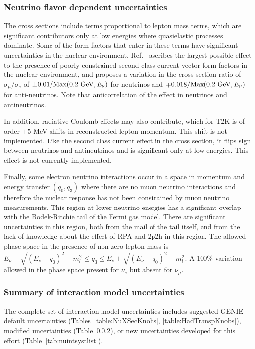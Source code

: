 \subsubsection{Neutrino flavor dependent uncertainties}
The cross sections include terms proportional to lepton mass terms, which are significant contributors only at low energies where quasielastic processes dominate.  Some of the form factors that enter in these terms have significant uncertainties in the nuclear environment.  Ref.~\cite{Day-McFarland:2012} ascribes the largest possible effect to the presence of poorly constrained second-class current vector form factors in the nuclear environment, and proposes a variation in the cross section ratio of $\sigma_\mu/\sigma_e$ of $\pm 0.01/{\rm\textstyle Max}(0.2~{\rm\textstyle GeV},E_\nu)$ for neutrinos and $\mp 0.018/{\rm\textstyle Max}(0.2~ {\rm\textstyle GeV},E_\nu)$ for anti-neutrinos.  Note that anticorrelation of the effect in neutrinos and antineutrinos.    

In addition, radiative Coulomb effects may also contribute, which for T2K is of order $\pm5$ MeV shifts in reconstructed lepton momentum.  This shift is not implemented.  Like the second class current effect in the cross section, it flips sign between neutrinos and antineutrinos and is significant only at low energies.  This effect is not currently implemented.

Finally, some electron neutrino interactions occur in a space in momentum and energy transfer $(q_0,q_3)$ where there are no muon neutrino interactions and therefore the nuclear response has not been constrained by muon neutrino measurements.  This region at lower neutrino energies has a significant overlap with the Bodek-Ritchie tail of the Fermi gas model.  There are significant uncertainties in this region, both from the mail of the tail itself, and from the lack of knowledge about the effect of RPA and 2p2h in this region.  The allowed phase space in the presence of non-zero lepton mass is $E_\nu-\sqrt{\left( E_\nu-q_0\right) ^2-m_l^2}\leq q_3\leq E_\nu+\sqrt{\left( E_\nu-q_0\right) ^2-m_l^2}$.  A 100\% variation allowed in the phase space present for $\nu_e$ but absent for $\nu_\mu$. \\ 

\subsubsection{Summary of interaction model uncertainties}

The complete set of interaction model uncertainties includes suggested GENIE default uncertainties (Tables~\ref{table:NuXSecKnobs}, %
\ref{table:HadTranspKnobs}),  modified uncertainties (Table~\ref{}), or new uncertainties developed for this effort (Table~\ref{tab:nuintsystlist}). 

